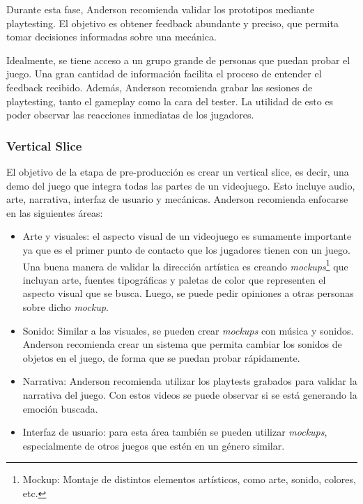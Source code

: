 \par Durante esta fase, Anderson recomienda validar los prototipos mediante playtesting. El objetivo es obtener feedback abundante y preciso, que permita tomar decisiones informadas sobre una mecánica.
\par Idealmente, se tiene acceso a un grupo grande de personas que puedan probar el juego. Una gran cantidad de información facilita el proceso de entender el feedback recibido. Además, Anderson recomienda grabar las sesiones de playtesting, tanto el gameplay como la cara del tester. La utilidad de esto es poder observar las reacciones inmediatas de los jugadores.
%
\subsubsection{Vertical Slice}
El objetivo de la etapa de pre-producción es crear un vertical slice, es decir, una demo del juego que integra todas las partes de un videojuego. Esto incluye audio, arte, narrativa, interfaz de usuario y mecánicas. Anderson recomienda enfocarse en las siguientes áreas:
\begin{itemize}
  \item Arte y visuales: el aspecto visual de un videojuego es sumamente importante ya que es el primer punto de contacto que los jugadores tienen con un juego. Una buena manera de validar la dirección artística es creando \textit{mockups}\footnote{Mockup: Montaje de distintos elementos artísticos, como arte, sonido, colores, etc.} que incluyan arte, fuentes tipográficas y paletas de color que representen el aspecto visual que se busca. Luego, se puede pedir opiniones a otras personas sobre dicho \textit{mockup}.
  \item Sonido: Similar a las visuales, se pueden crear \textit{mockups} con música y sonidos. Anderson recomienda crear un sistema que permita cambiar los sonidos de objetos en el juego, de forma que se puedan probar rápidamente.
  \item Narrativa: Anderson recomienda utilizar los playtests grabados para validar la narrativa del juego. Con estos videos se puede observar si se está generando la emoción buscada.
  \item Interfaz de usuario: para esta área también se pueden utilizar \textit{mockups}, especialmente de otros juegos que estén en un género similar.
\end{itemize}
%
%
